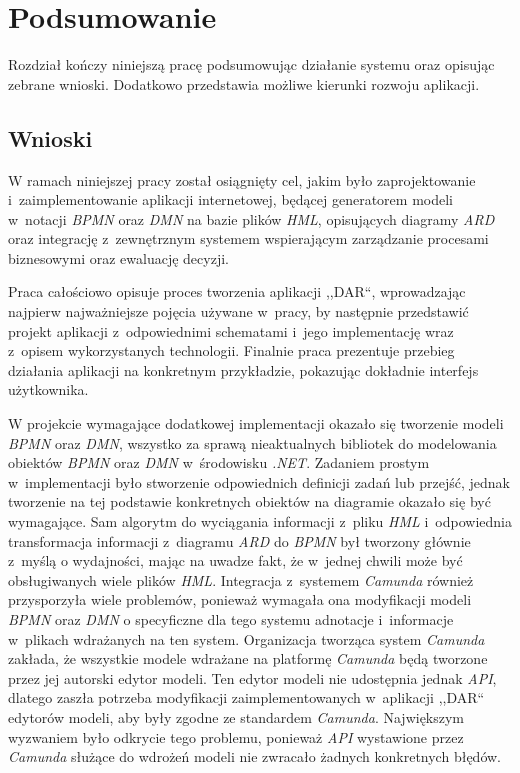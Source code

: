 \chapter{Podsumowanie}
\label{cha:podsumowanie}
Rozdział kończy niniejszą pracę podsumowując działanie systemu oraz opisując zebrane wnioski. Dodatkowo przedstawia możliwe kierunki rozwoju aplikacji.

\section{Wnioski}
\label{sec:wnioski}
W ramach niniejszej pracy został osiągnięty cel, jakim było zaprojektowanie i~zaimplementowanie aplikacji internetowej, będącej generatorem modeli w~notacji \emph{BPMN} oraz \emph{DMN} na bazie plików \emph{HML}, opisujących diagramy \emph{ARD} oraz integrację z~zewnętrznym systemem wspierającym zarządzanie procesami biznesowymi oraz ewaluację decyzji.

Praca całościowo opisuje proces tworzenia aplikacji ,,DAR``, wprowadzając najpierw najważniejsze pojęcia używane w~pracy, by następnie przedstawić projekt aplikacji z~odpowiednimi schematami i~jego implementację wraz z~opisem wykorzystanych technologii. Finalnie praca prezentuje przebieg działania aplikacji na konkretnym przykładzie, pokazując dokładnie interfejs użytkownika.

W projekcie wymagające dodatkowej implementacji okazało się tworzenie modeli \emph{BPMN} oraz \emph{DMN}, wszystko za sprawą nieaktualnych bibliotek do modelowania obiektów \emph{BPMN} oraz \emph{DMN} w~środowisku \emph{.NET}. Zadaniem prostym w~implementacji było stworzenie odpowiednich definicji zadań lub przejść, jednak tworzenie na tej podstawie konkretnych obiektów na diagramie okazało się być wymagające. Sam algorytm do wyciągania informacji z~pliku \emph{HML} i~odpowiednia transformacja informacji z~diagramu \emph{ARD} do \emph{BPMN} był tworzony głównie z~myślą o wydajności, mając na uwadze fakt, że w~jednej chwili może być obsługiwanych wiele plików \emph{HML}. Integracja z~systemem \emph{Camunda} również przysporzyła wiele problemów, ponieważ wymagała ona modyfikacji modeli \emph{BPMN} oraz \emph{DMN} o specyficzne dla tego systemu adnotacje i~informacje w~plikach wdrażanych na ten system. Organizacja tworząca system \emph{Camunda} zakłada, że wszystkie modele wdrażane na platformę \emph{Camunda} będą tworzone przez jej autorski edytor modeli. Ten edytor modeli nie udostępnia jednak \emph{API}, dlatego zaszła potrzeba modyfikacji zaimplementowanych w~aplikacji ,,DAR`` edytorów modeli, aby były zgodne ze standardem \emph{Camunda}. Największym wyzwaniem było odkrycie tego problemu, ponieważ \emph{API} wystawione przez \emph{Camunda} służące do wdrożeń modeli nie zwracało żadnych konkretnych błędów.
\newpage

